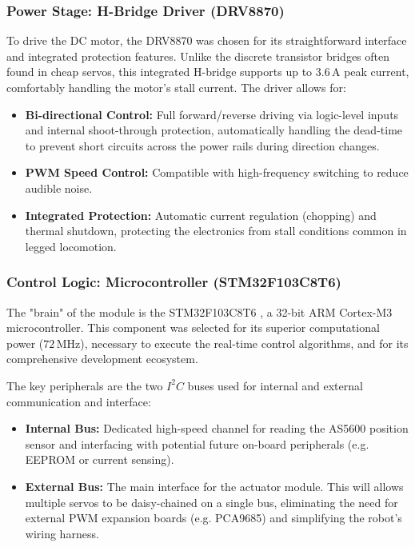 \subsubsection{Power Stage: H-Bridge Driver (DRV8870)}

To drive the DC motor, the DRV8870 \cite{drv8870} was chosen for its straightforward interface and integrated
protection features. Unlike the discrete transistor bridges often found in cheap servos, this integrated
H-bridge supports up to $3.6\,\text{A}$ peak current, comfortably handling the motor's stall current. The
driver allows for:

\begin{itemize}
    \item \textbf{Bi-directional Control:} Full forward/reverse driving via logic-level inputs and internal
        shoot-through protection, automatically handling the dead-time to prevent short circuits across the
        power rails during direction changes.
    \item \textbf{PWM Speed Control:} Compatible with high-frequency switching to reduce audible noise.
    \item \textbf{Integrated Protection:} Automatic current regulation (chopping) and thermal shutdown,
        protecting the electronics from stall conditions common in legged locomotion.
\end{itemize}


\subsubsection{Control Logic: Microcontroller (STM32F103C8T6)}

The "brain" of the module is the STM32F103C8T6 \cite{stm32f103c8t6}, a 32-bit ARM Cortex-M3 microcontroller.
This component was selected for its superior computational power ($72\,\text{MHz}$), necessary to execute the
real-time control algorithms, and for its comprehensive development ecosystem.

The key peripherals are the two $I^2C$ buses used for internal and external communication and interface:

\begin{itemize}
    \item \textbf{Internal Bus:} Dedicated high-speed channel for reading the AS5600 position sensor and
        interfacing with potential future on-board peripherals (e.g. EEPROM or current sensing).
    \item \textbf{External Bus:} The main interface for the actuator module. This will allows multiple
    servos to be daisy-chained on a single bus, eliminating the need for external PWM expansion boards (e.g.
    PCA9685) and simplifying the robot's wiring harness.
\end{itemize}

